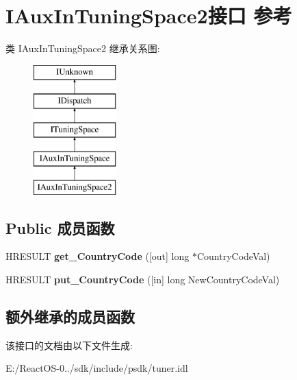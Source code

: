 \hypertarget{interface_i_aux_in_tuning_space2}{}\section{I\+Aux\+In\+Tuning\+Space2接口 参考}
\label{interface_i_aux_in_tuning_space2}
类 I\+Aux\+In\+Tuning\+Space2 继承关系图\+:\begin{figure}[H]
\begin{center}
\leavevmode
\includegraphics[height=5.000000cm]{interface_i_aux_in_tuning_space2}
\end{center}
\end{figure}
\subsection*{Public 成员函数}
\begin{DoxyCompactItemize}
\item 
\mbox{\label{interface_i_aux_in_tuning_space2_a028f4b794be67c5d644d5a52b118df85}} 
H\+R\+E\+S\+U\+LT {\bfseries get\+\_\+\+Country\+Code} (\mbox{[}out\mbox{]} long $\ast$Country\+Code\+Val)
\item 
\mbox{\label{interface_i_aux_in_tuning_space2_abbdfa7c82f721fa32ddb3043a7541019}} 
H\+R\+E\+S\+U\+LT {\bfseries put\+\_\+\+Country\+Code} (\mbox{[}in\mbox{]} long New\+Country\+Code\+Val)
\end{DoxyCompactItemize}
\subsection*{额外继承的成员函数}


该接口的文档由以下文件生成\+:\begin{DoxyCompactItemize}
\item 
E\+:/\+React\+O\+S-\/0../sdk/include/psdk/tuner.\+idl\end{DoxyCompactItemize}
